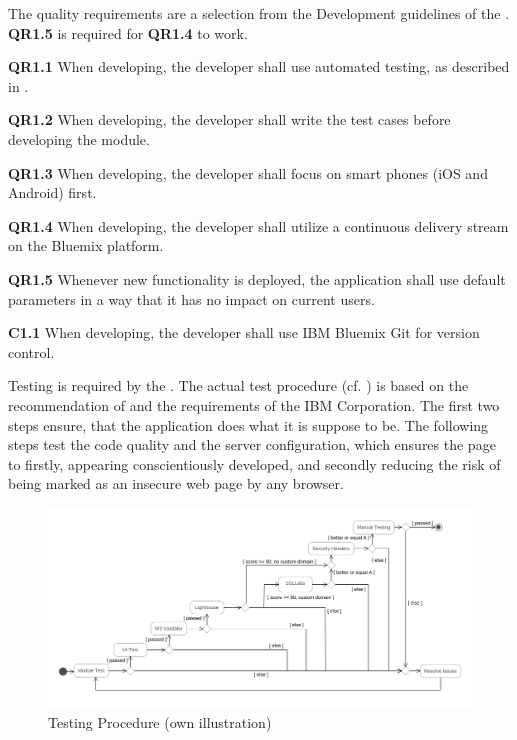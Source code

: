 The quality requirements are a selection from the Development guidelines of the \textcite{IBMCorporation.2016}. \textbf{QR1.5} is required for \textbf{QR1.4} to work.

\begin{closeItem}
      \item [\textbf{QR1.1}] When developing, the developer shall use automated testing, as described in .
      \item [\textbf{QR1.2}] When developing, the developer shall write the test cases before developing the module.
      \item [\textbf{QR1.3}] When developing, the developer shall focus on smart phones (iOS and Android) first.
      \item [\textbf{QR1.4}] When developing, the developer shall utilize a continuous delivery stream on the Bluemix platform. \item [\textbf{QR1.5}] Whenever new functionality is deployed, the application shall use default parameters in a way that it has no impact on current users.
      \item [\textbf{C1.1}] When developing, the developer shall use IBM Bluemix Git for version control.
\end{closeItem}

Testing is required by the \textcite{IBMCorporation.2016}. The actual test procedure (cf. ) is based on the recommendation of \textcite{OpenWebApplicationSecurityProject.} and the requirements of the IBM Corporation. The first two steps ensure, that the application does what it is suppose to be. The following steps test the code quality and the server configuration, which ensures the page to firstly, appearing conscientiously developed, and secondly reducing the risk of being marked as an insecure web page by any browser.

\begin{figure}[H]
    \centering
    \includegraphics[width=\textwidth]{img/diagrams/Activity/Testing.png}
    \caption[Testing Procedure]{Testing Procedure (own illustration)}
    \label{fig:test}
\end{figure}



